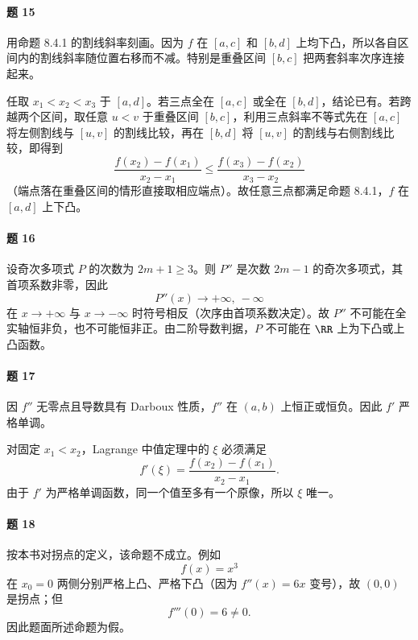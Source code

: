 \paragraph{题 15}
\begin{xsolution}
用命题 8.4.1 的割线斜率刻画。因为 $f$ 在 $[a,c]$ 和 $[b,d]$ 上均下凸，所以各自区间内的割线斜率随位置右移而不减。特别是重叠区间 $[b,c]$ 把两套斜率次序连接起来。

任取 $x_1<x_2<x_3$ 于 $[a,d]$。若三点全在 $[a,c]$ 或全在 $[b,d]$，结论已有。若跨越两个区间，取任意 $u<v$ 于重叠区间 $[b,c]$，利用三点斜率不等式先在 $[a,c]$ 将左侧割线与 $[u,v]$ 的割线比较，再在 $[b,d]$ 将 $[u,v]$ 的割线与右侧割线比较，即得到
\[
  \frac{f(x_2)-f(x_1)}{x_2-x_1}
  \le
  \frac{f(x_3)-f(x_2)}{x_3-x_2}
\]
（端点落在重叠区间的情形直接取相应端点）。故任意三点都满足命题 8.4.1，$f$ 在 $[a,d]$ 上下凸。
\end{xsolution}

\paragraph{题 16}
\begin{xsolution}
设奇次多项式 $P$ 的次数为 $2m+1\ge3$。则 $P''$ 是次数 $2m-1$ 的奇次多项式，其首项系数非零，因此
\[
  P''(x)\to+\infty,\ -\infty
\]
在 $x\to+\infty$ 与 $x\to-\infty$ 时符号相反（次序由首项系数决定）。故 $P''$ 不可能在全实轴恒非负，也不可能恒非正。由二阶导数判据，$P$ 不可能在 $\RR$ 上为下凸或上凸函数。
\end{xsolution}

\paragraph{题 17}
\begin{xsolution}
因 $f''$ 无零点且导数具有 Darboux 性质，$f''$ 在 $(a,b)$ 上恒正或恒负。因此 $f'$ 严格单调。

对固定 $x_1<x_2$，Lagrange 中值定理中的 $\xi$ 必须满足
\[
  f'(\xi)=\frac{f(x_2)-f(x_1)}{x_2-x_1}.
\]
由于 $f'$ 为严格单调函数，同一个值至多有一个原像，所以 $\xi$ 唯一。
\end{xsolution}

\paragraph{题 18}
\begin{xsolution}
按本书对拐点的定义，该命题不成立。例如
\[
  f(x)=x^3
\]
在 $x_0=0$ 两侧分别严格上凸、严格下凸（因为 $f''(x)=6x$ 变号），故 $(0,0)$ 是拐点；但
\[
  f'''(0)=6\ne0.
\]
因此题面所述命题为假。
\end{xsolution}

